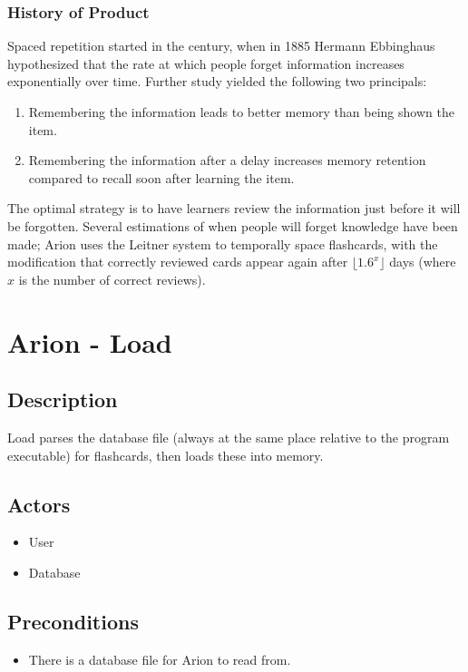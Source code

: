 \documentclass{scrreprt}
\begin{document}
\subsection{History of Product}
Spaced repetition started in the  century, when in 1885 Hermann Ebbinghaus
hypothesized that the rate at which people forget information increases exponentially
over time. Further study yielded the following two principals:
\begin{enumerate}[1.]
    \item Remembering the information leads to better memory than being shown the item.
    \item Remembering the information after a delay increases memory retention compared
        to recall soon after learning the item.
\end{enumerate}
The optimal strategy is to have learners review the information just before it will
be forgotten. Several estimations of when people will forget knowledge have been made;
Arion uses the Leitner system to temporally space flashcards, with the modification that
correctly reviewed cards appear again after $\lfloor 1.6^x \rfloor$ days
(where $x$ is the number of correct reviews).

\setcounter{chapter}{0} %

\chapter{Arion - Load}

\section{Description}
Load parses the database file (always at the same place relative to the program executable) for flashcards,
then loads these into memory.

\section{Actors}
\begin{itemize}
    \item User
    \item Database
\end{itemize}

\section{Preconditions}
\begin{itemize}
    \item There is a database file for Arion to read from.
\end{itemize}
\end{document}
